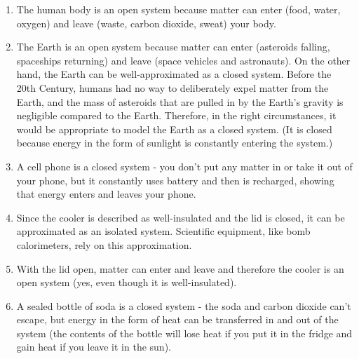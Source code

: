 \begin{Answer}[ref = systems]
\begin{enumerate}
\item The human body is an open system because matter can enter (food, water, 
oxygen) and leave (waste, carbon dioxide, sweat) your body.
\item The Earth is an open system because matter can enter (asteroids falling, 
spaceships returning) and leave (space vehicles and astronauts). On the other 
hand, the Earth can be well-approximated as a closed system. Before the 20th 
Century, humans had no way to deliberately expel matter from the Earth, and the 
mass of asteroids that are pulled in by the Earth's gravity is negligible 
compared to the Earth. Therefore, in the right circumstances, it would be 
appropriate to model the Earth as a closed system. (It is closed because 
energy in the form of sunlight is constantly entering the system.)
\item A cell phone is a closed system - you don't put any matter in or take it 
out of your phone, but it constantly uses battery and then is recharged, showing
that energy enters and leaves your phone. 
\item Since the cooler is described as well-insulated and the lid is closed, it 
can be approximated as an isolated system. Scientific equipment, like bomb 
calorimeters, rely on this approximation. 
\item With the lid open, matter can enter and leave and therefore the cooler is 
an open system (yes, even though it is well-insulated). 
\item A sealed bottle of soda is a closed system - the soda and carbon dioxide 
can't escape, but energy in the form of heat can be transferred in and out of 
the system (the contents of the bottle will lose heat if you put it in the 
fridge and gain heat if you leave it in the sun).
\end{enumerate}
\end{Answer}
